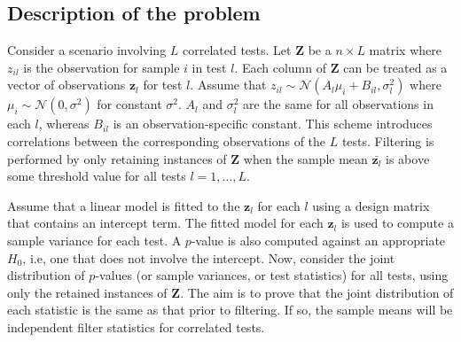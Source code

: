 \documentclass{article}
\newcommand{\nsamples}{n}
\newcommand{\sample}{i}
\newcommand{\normal}{\mathcal{N}}
\newcommand{\normean}{\mu}
\newcommand{\normvar}{\sigma^2}
\newcommand{\nullhypo}[1]{H_{0#1}}
\newcommand{\logcount}{z}
\newcommand{\oriobs}[0]{\mathbf{\logcount}}
\newcommand{\obsmat}[0]{\mathbf{Z}}
\newcommand{\test}{l}
\newcommand{\ntests}{L}
\newcommand{\scaling}{A}
\newcommand{\interceptor}{B}
\newcommand{\scalar}{\scaling_\test}
\newcommand{\intercept}{\interceptor_{\sample\test}}
\newcommand{\testvar}{\normvar_\test}
\newcommand{\testcolumn}[0]{\oriobs_\test}
\begin{document}
\subsection{Description of the problem}
Consider a scenario involving $\ntests$ correlated tests.
Let $\obsmat$ be a $\nsamples \times \ntests$ matrix where $\logcount_{\sample\test}$ is the observation for sample $\sample$ in test $\test$.
Each column of $\obsmat$ can be treated as a vector of observations $\testcolumn$ for test $\test$.
Assume that $\logcount_{\sample\test} \sim \normal(\scalar\normean_\sample + \intercept, \testvar)$ where $\normean_\sample \sim \normal(0, \normvar)$ for constant $\normvar$.
$\scalar$ and $\testvar$ are the same for all observations in each $\test$, whereas $\intercept$ is an observation-specific constant.
This scheme introduces correlations between the corresponding observations of the $\ntests$ tests.
Filtering is performed by only retaining instances of $\obsmat$ when the sample mean $\bar{\testcolumn}$ is above some threshold value for all tests $\test = 1, ..., \ntests$.


Assume that a linear model is fitted to the $\testcolumn$ for each $\test$ using a design matrix that contains an intercept term.
The fitted model for each $\testcolumn$ is used to compute a sample variance for each test.
A $p$-value is also computed against an appropriate $\nullhypo{}$, i.e, one that does not involve the intercept.
Now, consider the joint distribution of $p$-values (or sample variances, or test statistics) for all tests, using only the retained instances of $\obsmat$.
The aim is to prove that the joint distribution of each statistic is the same as that prior to filtering.
If so, the sample means will be independent filter statistics for correlated tests.
\end{document}
